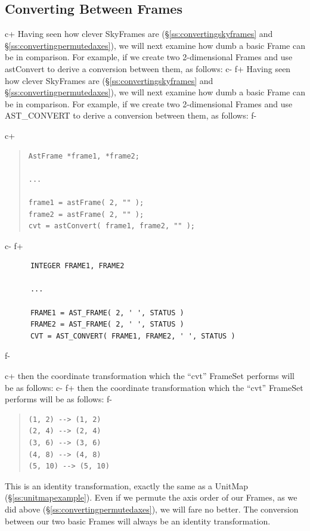 \documentclass[twoside,11pt]{article}
\newcommand{\secref}[1]{\S\ref{#1}}
\newcommand{\secref}[1]{\ref{#1}}
\begin{document}
\subsection{\label{ss:convertingframes}Converting Between Frames}

c+
Having seen how clever SkyFrames are (\secref{ss:convertingskyframes}
and \secref{ss:convertingpermutedaxes}), we will next examine how dumb
a basic Frame can be in comparison. For example, if we create two
2-dimensional Frames and use astConvert to derive a conversion between
them, as follows:
c-
f+
Having seen how clever SkyFrames are (\secref{ss:convertingskyframes}
and \secref{ss:convertingpermutedaxes}), we will next examine how dumb
a basic Frame can be in comparison. For example, if we create two
2-dimensional Frames and use AST\_CONVERT to derive a conversion
between them, as follows:
f-

c+
\begin{quote}
\small
\begin{verbatim}
AstFrame *frame1, *frame2;

...

frame1 = astFrame( 2, "" );
frame2 = astFrame( 2, "" );
cvt = astConvert( frame1, frame2, "" );
\end{verbatim}
\normalsize
\end{quote}
c-
f+
\small
\begin{verbatim}
      INTEGER FRAME1, FRAME2

      ...

      FRAME1 = AST_FRAME( 2, ' ', STATUS )
      FRAME2 = AST_FRAME( 2, ' ', STATUS )
      CVT = AST_CONVERT( FRAME1, FRAME2, ' ', STATUS )
\end{verbatim}
\normalsize
f-

c+
then the coordinate transformation which the ``cvt'' FrameSet performs
will be as follows:
c-
f+
then the coordinate transformation which the ``cvt'' FrameSet performs
will be as follows:
f-

\begin{quote}
\begin{verbatim}
(1, 2) --> (1, 2)
(2, 4) --> (2, 4)
(3, 6) --> (3, 6)
(4, 8) --> (4, 8)
(5, 10) --> (5, 10)
\end{verbatim}
\end{quote}

This is an identity transformation, exactly the same as a UnitMap
(\secref{ss:unitmapexample}). Even if we permute the axis order of our
Frames, as we did above (\secref{ss:convertingpermutedaxes}), we will
fare no better. The conversion between our two basic Frames will
always be an identity transformation.
\end{document}

